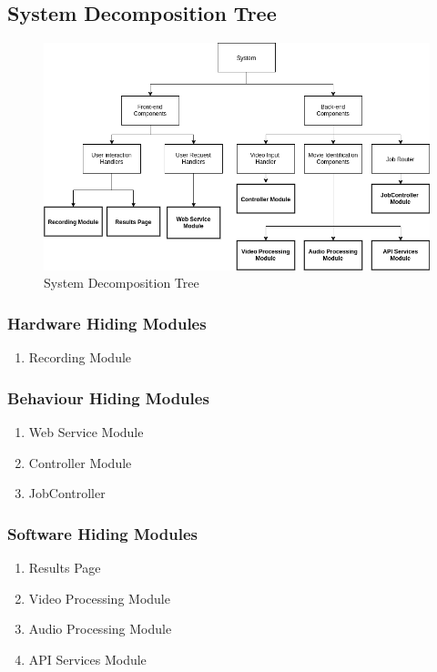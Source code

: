 \documentclass{article}
\begin{document}
\subsection{System Decomposition Tree}

\begin{figure}[H]
    \centering
    \includegraphics[width = \textwidth]{img/SystemDesign/system_decomp.png}
    \caption{System Decomposition Tree}
    \label{fig:Decomposition}
\end{figure}

\subsubsection{Hardware Hiding Modules}
\begin{enumerate}
    \item Recording Module
\end{enumerate}

\subsubsection{Behaviour Hiding Modules}
\begin{enumerate}
    \item Web Service Module
    \item Controller Module
    \item JobController
\end{enumerate}

\subsubsection{Software Hiding Modules}
\begin{enumerate}
    \item Results Page
    \item Video Processing Module
    \item Audio Processing Module
    \item API Services Module
\end{enumerate}
\end{document}
